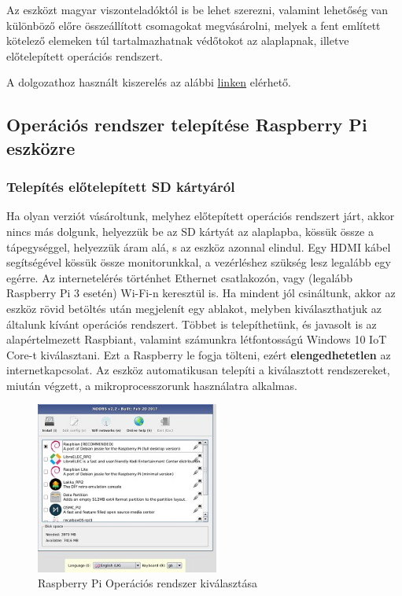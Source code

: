 \documentclass[a4paper,12pt]{report}
\begin{document}
    Az eszközt magyar viszonteladóktól is be lehet szerezni, valamint lehetőség van különböző előre összeállított csomagokat megvásárolni,
    melyek a fent említett kötelező elemeken túl tartalmazhatnak védőtokot az alaplapnak, illetve előtelepített operációs rendszert.

    A dolgozathoz használt kiszerelés az alábbi \href{https://malnapc.hu/yis/raspberry-pi-3-quad-core-suli-kit}{linken} elérhető.

    \subsection{Operációs rendszer telepítése Raspberry Pi eszközre}

    \subsubsection{Telepítés előtelepített SD kártyáról}
    Ha olyan verziót vásároltunk, melyhez előtepített operációs rendszert járt, akkor nincs más dolgunk, helyezzük be az SD kártyát
    az alaplapba, kössük össze a tápegységgel, helyezzük áram alá, s az eszköz azonnal elindul. Egy HDMI kábel segítségével kössük össze
    monitorunkkal, a vezérléshez szükség lesz legalább egy egérre. Az internetelérés történhet Ethernet csatlakozón, vagy (legalább Raspberry
    Pi 3 esetén) Wi-Fi-n keresztül is. Ha mindent jól csináltunk, akkor az eszköz rövid betöltés után megjelenít egy ablakot,
    melyben kiválaszthatjuk az általunk kívánt operációs rendszert. Többet is telepíthetünk, és javasolt is az alapértelmezett Raspbiant,
    valamint számunkra létfontosságú Windows 10 IoT Core-t kiválasztani. Ezt a Raspberry le fogja tölteni, ezért \textbf{elengedhetetlen} az internetkapcsolat.
    Az eszköz automatikusan telepíti a kiválasztott rendszereket, miután végzett, a mikroprocesszorunk használatra alkalmas.

    \begin{figure}[h!]
        \hspace{5cm}
        \includegraphics[width=6cm]{images/rpi_os_setup.jpg}
        \caption{Raspberry Pi Operációs rendszer kiválasztása}
        \label{fig: Raspberry Pi Operációs rendszer}
    \end{figure}
\end{document}
